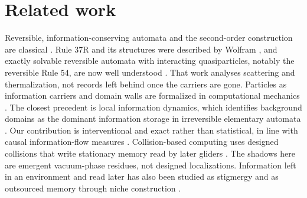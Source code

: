 \section{Related work}
Reversible, information-conserving automata and the second-order construction are classical
\cite{fredkin1982,toffoli1987,toffoli1990}. Rule 37R and its structures were described by Wolfram
\cite{wolfram2002}, and exactly solvable reversible automata with interacting quasiparticles,
notably the reversible Rule 54, are now well understood
\cite{buca2021,klobas2022,prosen2023,wilkinson2022}. That work analyses scattering and
thermalization, not records left behind once the carriers are gone. Particles as information carriers
and domain walls are formalized in computational mechanics
\cite{hanson1992,hanson1997,hordijk2001,pivato2007,rupe2018}. The closest precedent is local
information dynamics, which identifies background domains as the dominant information storage in
irreversible elementary automata \cite{lizier2012}. Our contribution is interventional and exact
rather than statistical, in line with causal information-flow measures \cite{ay2008,lizier2010caus}.
Collision-based computing uses designed collisions that write stationary memory read by later
gliders \cite{adamatzky2012,martinez2006,martinez2011,martinez2012}. The shadows here are
emergent vacuum-phase residues, not designed localizations. Information left in an environment and
read later has also been studied as stigmergy \cite{klyubin2004} and as outsourced memory through
niche construction \cite{lee2022}.
